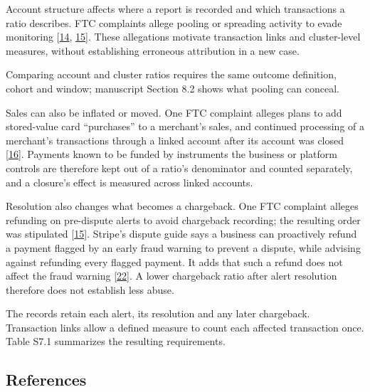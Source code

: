 \documentclass[
  11pt,
]{article}
\begin{document}
Account structure affects where a report is recorded and which
transactions a ratio describes. FTC complaints allege pooling or
spreading activity to evade monitoring
{[}\protect\hyperlink{ref-FTC2020FirstData}{14},
\protect\hyperlink{ref-FTC2025Paddle}{15}{]}. These allegations motivate
transaction links and cluster-level measures, without establishing
erroneous attribution in a new case.

Comparing account and cluster ratios requires the same outcome
definition, cohort and window; manuscript Section 8.2 shows what pooling
can conceal.

Sales can also be inflated or moved. One FTC complaint alleges plans to
add stored-value card ``purchases'' to a merchant's sales, and continued
processing of a merchant's transactions through a linked account after
its account was closed {[}\protect\hyperlink{ref-FTC2019Allied}{16}{]}.
Payments known to be funded by instruments the business or platform
controls are therefore kept out of a ratio's denominator and counted
separately, and a closure's effect is measured across linked accounts.

Resolution also changes what becomes a chargeback. One FTC complaint
alleges refunding on pre-dispute alerts to avoid chargeback recording;
the resulting order was stipulated
{[}\protect\hyperlink{ref-FTC2025Paddle}{15}{]}. Stripe's dispute guide
says a business can proactively refund a payment flagged by an early
fraud warning to prevent a dispute, while advising against refunding
every flagged payment. It adds that such a refund does not affect the
fraud warning {[}\protect\hyperlink{ref-Stripe2026Disputes}{22}{]}. A
lower chargeback ratio after alert resolution therefore does not
establish less abuse.

The records retain each alert, its resolution and any later chargeback.
Transaction links allow a defined measure to count each affected
transaction once. Table S7.1 summarizes the resulting requirements.

\FloatBarrier

\hypertarget{references}{%
\subsection{References}\label{references}}

\suppressfloats[t]
\end{document}
